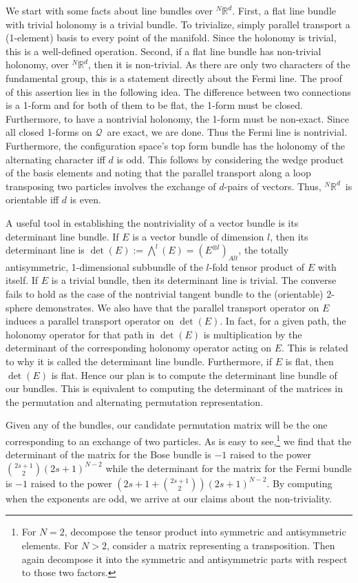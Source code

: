 \documentclass[11pt]{article}
\theoremstyle{remark}
\begin{document}
We start with some facts about line bundles over \ensuremath{{}^N\ensuremath{\mathbb{R}^{\ensuremath{d}}}}. First, a 
flat line bundle with trivial holonomy is a trivial bundle. To
trivialize, simply parallel transport a (1-element) basis to every
point of the manifold. Since the
holonomy is trivial, this is a well-defined operation. Second, if a
flat line bundle has non-trivial holonomy, over \ensuremath{{}^N\ensuremath{\mathbb{R}^{\ensuremath{d}}}}, then it is
non-trivial. As there are only two characters of the fundamental
group, this is a statement directly about the Fermi line. The
proof of this assertion lies in the following idea.
The difference between
two connections is a 1-form and for both of them to be flat, the
1-form must be closed. Furthermore, to have a nontrivial holonomy, the
1-form must be non-exact. Since all closed 1-forms on \ensuremath{\mathcal{Q}}\ are exact, we
are done. Thus the Fermi line is nontrivial. Furthermore, the
configuration space's top form bundle has the holonomy of the
alternating character iff $d$ is odd. This follows by considering the
wedge product of the basis elements and noting that the parallel transport
along a loop transposing two particles involves the exchange of 
 $d$-pairs of vectors. Thus, \ensuremath{{}^N\ensuremath{\mathbb{R}^{\ensuremath{d}}}}\ is orientable iff $d$ is even.

A useful tool in establishing the nontriviality of a vector bundle is
its determinant line bundle. If $E$ is a vector bundle of dimension $l$,
then its determinant line is $\det(E) \ensuremath{:=} \bigwedge^l (E) = (E^{\otimes
l})_{Alt}$, the totally antisymmetric, 1-dimensional subbundle of the
$l$-fold tensor product of $E$ with itself. If $E$ is a trivial
bundle, then its determinant line is trivial. The converse fails to
hold as the case of the nontrivial tangent bundle to the (orientable)
2-sphere demonstrates. 
We also have that the parallel transport operator on $E$ induces a
parallel transport 
operator on $\det(E)$. In fact, for a given path, the 
holonomy operator for that path in $\det(E)$ is multiplication by the
determinant of the corresponding holonomy operator acting on $E$. This
is related to why it is called the determinant line bundle. Furthermore, if $E$
is flat, then $\det(E)$ is flat. Hence our plan is to compute the
determinant line bundle of our bundles. This is equivalent to computing
the determinant of the matrices in the permutation and alternating
 permutation representation. 

Given any of the bundles, our candidate permutation matrix will be the
one corresponding to an exchange of two particles. As is easy to
see,\footnote{For $N=2$, decompose the tensor product into symmetric
and antisymmetric elements. For $N>2$, consider a matrix representing
a transposition. Then again decompose it into the symmetric and
antisymmetric parts with respect to those two factors.} 
we find that the determinant of the matrix for the Bose bundle is 
$-1$ raised to the power $\binom{2s+1}{2}(2s+1)^{N-2}$ while the
determinant for the 
matrix for the Fermi bundle is $-1$ raised to the power $(2s+1 +
\binom{2s+1}{2})(2s+1)^{N-2}$. By computing when the exponents are
odd, we arrive at our claims about the non-triviality. 
\end{document}
